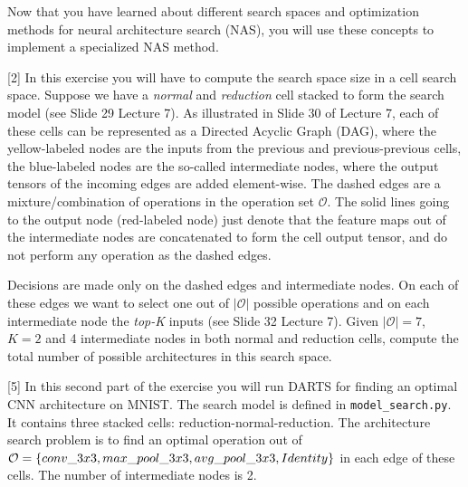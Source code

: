 \documentclass{exam}
\begin{document}
	\gccs
	Now that you have learned about different search spaces and optimization methods for neural architecture search (NAS), you will use these concepts to implement a specialized NAS method.
	\begin{questions}
		[2]
		In this exercise you will have to compute the search space size in a cell search space. Suppose we have a \textit{normal} and \textit{reduction}
		cell stacked to form the search model (see Slide 29 Lecture 7). As illustrated in Slide 30 of Lecture 7, each of these cells can be represented as a Directed Acyclic Graph (DAG),
		where the yellow-labeled nodes are the inputs from the previous and previous-previous cells, the blue-labeled nodes are the so-called intermediate nodes, where the output tensors of the
		incoming edges are added element-wise. The dashed edges are a mixture/combination of operations in the operation set $\mathcal{O}$.
		The solid lines going to the output node (red-labeled node) just denote that the feature maps out of the intermediate nodes are concatenated to form the cell output tensor, and do not
		perform any operation as the dashed edges.

		Decisions are made only on the dashed edges and intermediate nodes. On each of these edges we want to select one out of $\lvert \mathcal{O}\rvert$ possible operations and on each
		intermediate node the \textit{top-K} inputs (see Slide 32 Lecture 7). Given $\lvert \mathcal{O}\rvert = 7$, $K=2$ and 4 intermediate nodes in both normal and reduction cells,
		compute the total number of possible architectures in this search space.

		[5]
		In this second part of the exercise you will run DARTS for finding an optimal CNN architecture on MNIST.
		The search model is defined in \texttt{model\_search.py}. It contains three stacked cells: 
		reduction-normal-reduction. The architecture search problem is to find an optimal operation out of
		$\mathcal{O} = \{conv\_3x3,\\ max\_pool\_3x3, avg\_pool\_3x3, Identity\}$ in each edge
		of these cells. The number of intermediate nodes is 2. 
		
\end{questions}
\end{document}
